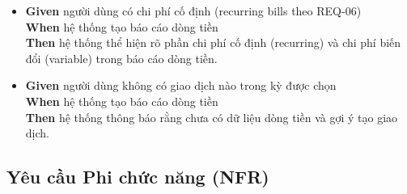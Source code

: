 \begin{itemize}
\item \textbf{Given} người dùng có chi phí cố định (recurring bills theo REQ-06)  \\ \hspace*{1.5em}  \textbf{When} hệ thống tạo báo cáo dòng tiền  \\ \hspace*{1.5em}  \textbf{Then} hệ thống thể hiện rõ phần chi phí cố định (recurring) và chi phí biến đổi (variable) trong báo cáo dòng tiền.
\item \textbf{Given} người dùng không có giao dịch nào trong kỳ được chọn  \\ \hspace*{1.5em}  \textbf{When} hệ thống tạo báo cáo dòng tiền  \\ \hspace*{1.5em}  \textbf{Then} hệ thống thông báo rằng chưa có dữ liệu dòng tiền và gợi ý tạo giao dịch.
\end{itemize}
\subsection{Yêu cầu Phi chức năng (NFR)}


